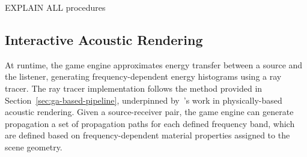 EXPLAIN ALL procedures

\subsection{Interactive Acoustic Rendering}
At runtime, the game engine approximates energy transfer between a source and the listener, generating frequency-dependent energy histograms using a ray tracer. The ray tracer implementation follows the method provided in Section~\ref{sec:ga-based-pipeline}, underpinned by~\cite{schroder2011physically}'s work in physically-based acoustic rendering.
Given a source-receiver pair, the game engine can generate propagation a set of propagation paths for each defined frequency band, which are defined based on frequency-dependent material properties assigned to the scene geometry.\par

